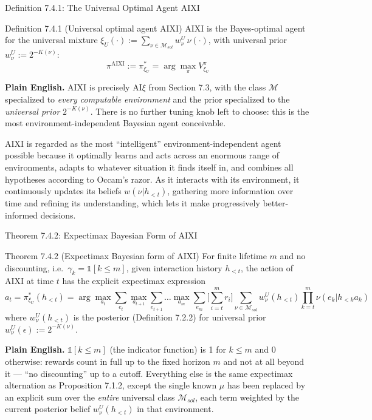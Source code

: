 \documentclass[aspectratio=169,10pt]{beamer}
\newcommand{\Mcal}{\mathcal{M}}
\newcommand{\Msol}{\mathcal{M}_{sol}}
\begin{document}
\begin{frame}{Definition 7.4.1: The Universal Optimal Agent AIXI}
  \begin{block}{Definition 7.4.1 (Universal optimal agent AIXI)}
    AIXI is the Bayes-optimal agent for the universal mixture
    $\xi_U(\cdot) := \sum_{\nu\in\Msol} w_\nu^U\,\nu(\cdot)$, with universal
    prior $w_\nu^U := 2^{-K(\nu)}$:
    \[
      \pi^{\mathrm{AIXI}} := \pi_{\xi_U}^* = \arg\max_\pi V_{\xi_U}^\pi
    \]
  \end{block}
  \textbf{Plain English.} AIXI is precisely AI$\xi$ from Section 7.3, with
  the class $\Mcal$ specialized to \emph{every computable environment} and
  the prior specialized to the \emph{universal prior} $2^{-K(\nu)}$. There
  is no further tuning knob left to choose: this is the most
  environment-independent Bayesian agent conceivable.

  \vspace{2mm}
  AIXI is regarded as the most ``intelligent'' environment-independent agent
  possible because it optimally learns and acts across an enormous range of
  environments, adapts to whatever situation it finds itself in, and
  combines all hypotheses according to Occam's razor. As it interacts with
  its environment, it continuously updates its beliefs $w(\nu|h_{<t})$,
  gathering more information over time and refining its understanding,
  which lets it make progressively better-informed decisions.
\end{frame}

\begin{frame}{Theorem 7.4.2: Expectimax Bayesian Form of AIXI}
  \begin{block}{Theorem 7.4.2 (Expectimax Bayesian form of AIXI)}
    For finite lifetime $m$ and no discounting, i.e.\
    $\gamma_k=\mathbb{1}[k\le m]$, given interaction history $h_{<t}$, the
    action of AIXI at time $t$ has the explicit expectimax expression
    \[
      a_t = \pi_{\xi_U}^*(h_{<t}) = \arg\max_{a_t}\sum_{e_t}\max_{a_{t+1}}
      \sum_{e_{t+1}}\dots\max_{a_m}\sum_{e_m}\Big[\sum_{i=t}^m r_i\Big]
      \sum_{\nu\in\Msol} w_\nu^U(h_{<t})\prod_{k=t}^m\nu(e_k|h_{<k}a_k)
    \]
    where $w_\nu^U(h_{<t})$ is the posterior (Definition 7.2.2) for
    universal prior $w_\nu^U(\epsilon):=2^{-K(\nu)}$.
  \end{block}
  \textbf{Plain English.} $\mathbb{1}[k\le m]$ (the indicator function) is 1
  for $k\le m$ and 0 otherwise: rewards count in full up to the fixed
  horizon $m$ and not at all beyond it --- ``no discounting'' up to a
  cutoff. Everything else is the same expectimax alternation as
  Proposition 7.1.2, except the single known $\mu$ has been replaced by an
  explicit sum over the \emph{entire} universal class $\Msol$, each term
  weighted by the current posterior belief $w_\nu^U(h_{<t})$ in that
  environment.
\end{frame}
\end{document}
